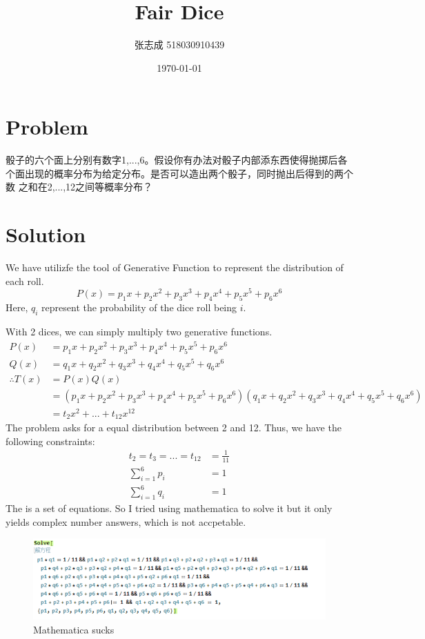 \documentclass[UTF8, 12pt]{ctexart}
\title{Fair Dice}
\author{张志成 518030910439}
\date{\today}
\begin{document}
    \maketitle

    \section{Problem}
    骰子的六个面上分别有数字1,...,6。假设你有办法对骰子内部添东西使得抛掷后各个面出现的概率分布为给定分布。是否可以造出两个骰子，同时抛出后得到的两个数
    之和在2,...,12之间等概率分布？

    \section{Solution}
    We have utilizfe the tool of Generative Function to represent the distribution of each roll. 
    $$ P(x) = p_1x + p_2x^2 + p_3x^3 + p_4x^4 + p_5x^5 + p_6x^6 $$
    Here, $q_i$ represent the probability of the dice roll being $i$.
    
    With 2 dices, we can simply multiply two generative functions.
    \begin{align*}
        P(x) &= p_1x + p_2x^2 + p_3x^3 + p_4x^4 + p_5x^5 + p_6x^6 \\
        Q(x) &= q_1x + q_2x^2 + q_3x^3 + q_4x^4 + q_5x^5 + q_6x^6 \\
        \therefore T(x) &= P(x)Q(x) \\ &= (p_1x + p_2x^2 + p_3x^3 + p_4x^4 + p_5x^5 + p_6x^6)(q_1x + q_2x^2 + q_3x^3 + q_4x^4 + q_5x^5 + q_6x^6) \\
        &= t_2x^2 + ... + t_{12}x^{12}
    \end{align*}
    The problem asks for a equal distribution between 2 and 12.
    Thus, we have the following constraints:
    \begin{align}
        t_2 = t_3 = ... = t_{12} &= \frac{1}{11} \\
        \sum_{i = 1}^{6} p_i &= 1 \\
        \sum_{i = 1}^{6} q_i &= 1
    \end{align}
    The is a set of equations. So I tried using mathematica to solve it but it only yields complex number answers, which is not accpetable.
    \begin{figure}[htbp]
        \includegraphics{solve.png}
        \caption{Mathematica sucks}
    \end{figure}
\end{document}
